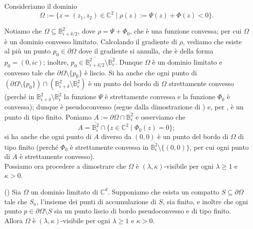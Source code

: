 Consideriamo il dominio
$$\Omega:=\{z=(z_1,z_2)\in\mathbb{C}^2\mid \rho(z):=\Psi(z)+\Phi(z)<0\}.$$

Notiamo che $\Omega\subseteq\mathbb{B}^2_{\epsilon+\delta/2}$, dove $\rho=\Psi+\Phi_0$, che è una funzione convessa; per cui $\Omega$ è un dominio convesso limitato. Calcolando il gradiente di $\rho$, vediamo che esiste al più un punto $p_0\in\partial\Omega$ dove il gradiente si annulla, che è della forma $p_0=(0,ic)$; inoltre, $p_0\in\overline{\mathbb{B}^2_{\epsilon+\delta/2}}\setminus\overline{\mathbb{B}^2_\epsilon}$. Dunque $\Omega$ è un dominio limitato e convesso tale che $\partial\Omega\setminus\{p_0\}$ è liscio. Si ha anche che ogni punto di $(\partial\Omega\setminus\{p_0\})\cap(\mathbb{B}^2_{\epsilon+\delta}\setminus\overline{\mathbb{B}^2_\epsilon})$ è un punto del bordo di $\Omega$ strettamente convesso (perché in $\mathbb{B}^2_{\epsilon+\delta}\setminus\overline{\mathbb{B}^2_\epsilon}$ la funzione $\Psi$ è strettamente convessa e la funzione $\Phi_0$ è convessa); dunque è pseudoconvesso (segue dalla dimostrazione di \cite[Proposition 2.1.13]{A1}) e, per \cite[Corollary 5.6]{D'A}, è un punto di tipo finito. Poniamo $A:=\partial\Omega\cap\overline{\mathbb{B}^2_\epsilon}$ e osserviamo che
$$A=\overline{\mathbb{B}^2_\epsilon}\cap\{z\in\mathbb{C}^2\mid \Phi_0(z)=0\};$$
si ha anche che ogni punto di $A$ diverso da $(0,0)$ è un punto del bordo di $\Omega$ di tipo finito (perché $\Phi_0$ è strettamente convessa in $\overline{\mathbb{B}^2_\epsilon}\setminus\{(0,0)\}$, per cui ogni punto di $A$ è strettamente convesso). \\

Possiamo ora procedere a dimostrare che $\Omega$ è $(\lambda,\kappa)$-visibile per ogni $\lambda \ge 1$ e $\kappa>0$.

\begin{prop} \label{safinisvis}
    (\cite[Corollary 1.10]{CMS}) Sia $\Omega$ un dominio limitato di $\mathbb{C}^d$. Supponiamo che esista un compatto $S\subseteq\partial\Omega$ tale che $S_a$, l'insieme dei punti di accumulazione di $S$, sia finito, e inoltre che ogni punto $p\in\partial\Omega\setminus S$ sia un punto liscio di bordo pseudoconvesso e di tipo finito. Allora $\Omega$ è $(\lambda,\kappa)$-visibile per ogni $\lambda \ge 1$ e $\kappa>0$.
\end{prop}


